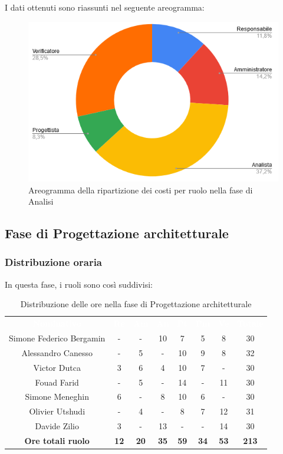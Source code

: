 I dati ottenuti sono riassunti nel seguente areogramma:
\begin{figure}[H]
\centering
\includegraphics[scale=0.60]{img/grafici/torta_fase_analisi_prospetto_economico.png}
\caption{Areogramma della ripartizione dei costi per ruolo nella fase di Analisi}
\end{figure}
 
 
\subsection{Fase di Progettazione architetturale}
\subsubsection{Distribuzione oraria}
In questa fase, i ruoli sono così suddivisi:
\begin{table}[H]
\centering\renewcommand{\arraystretch}{1.5}
\caption{Distribuzione delle ore nella fase di Progettazione architetturale}
\vspace{0.2cm}
\begin{tabular}{ c c c c c c c c }
\rowcolor{redafk}
\textcolor{white}{\textbf{Nominativo}} & \textcolor{white}{\textbf{Re}} &
\textcolor{white}{\textbf{Am}} & \textcolor{white}{\textbf{An}} &
\textcolor{white}{\textbf{Pt}} & \textcolor{white}{\textbf{Pm}} &
\textcolor{white}{\textbf{Ve}} & \textcolor{white}{\textbf{Totale}} \\
Simone Federico Bergamin & - & - & 10 & 7 & 5 & 8 & 30 \\
Alessandro Canesso & - & 5 & - & 10 & 9 & 8 & 32 \\
Victor Dutca & 3 & 6 & 4 & 10 & 7 & - & 30 \\
Fouad Farid & - & 5 & - & 14 & - & 11 & 30 \\
Simone Meneghin & 6 & - & 8 & 10 & 6 & - & 30 \\
Olivier Utshudi & - & 4 & - & 8 & 7 & 12 & 31 \\
Davide Zilio & 3 & - & 13 & - & - & 14 & 30 \\
\rowcolor{lastrowcolor}
\textbf{Ore totali ruolo} & \textbf{12} & \textbf{20} & \textbf{35} & \textbf{59} & \textbf{34} & \textbf{53} & \textbf{213} \\
\end{tabular}
\end{table}
 
